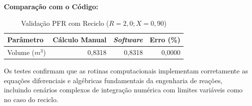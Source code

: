 \textbf{Comparação com o Código:}
\begin{table}[H]
    \centering
    \caption{Validação PFR com Reciclo ($R=2,0; X=0,90$)}
    \begin{tabular}{lrrr}
        \toprule
        \textbf{Parâmetro} & \textbf{Cálculo Manual} & \textbf{\textit{Software}} & \textbf{Erro (\%)} \\
        \midrule
        Volume ($m^3$) & 0,8318 & 0,8318 & 0,0000 \\
        \bottomrule
    \end{tabular}
\end{table}

Os testes confirmam que as rotinas computacionais implementam corretamente as equações diferenciais e algébricas fundamentais da engenharia de reações, incluindo cenários complexos de integração numérica com limites variáveis como no caso do reciclo.
